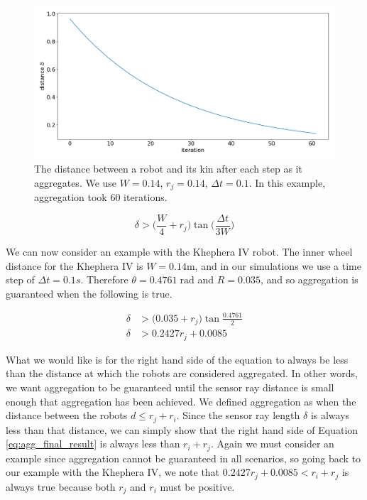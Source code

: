 \documentclass[conference]{IEEEtran}
\begin{document}
    \begin{figure}
      \centering
      \includegraphics[width=1\linewidth]{./images/dist_plot.png}
      \caption{The distance between a robot and its kin after each step as it aggregates. We use $W=0.14$, $r_j=0.14$, $\Delta t=0.1$. In this example, aggregation took 60 iterations.}
      \label{fig:dist_plot}
    \end{figure}

    \begin{equation}
      \label{eq:agg_final_result}
      \delta > \bigg(\frac{W}{4} + r_j\bigg)\tan\bigg(\frac{\Delta t}{3W}\bigg)
    \end{equation}

    We can now consider an example with the Khephera IV robot. The inner wheel distance for the Khephera IV is $W=0.14$m, and in our simulations we use a time step of $\Delta t = 0.1s$. Therefore $\theta = 0.4761\;\text{rad}$ and $R=0.035$, and so aggregation is guaranteed when the following is true.

    \begin{equation} \label{eq:khephera_agg}
      \begin{split}
        \delta &> \bigg(0.035 + r_j\bigg)\tan\frac{0.4761}{2} \\
        \delta &> 0.2427 r_j + 0.0085
      \end{split}
    \end{equation}

     What we would like is for the right hand side of the equation to always be less than the distance at which the robots are considered aggregated. In other words, we want aggregation to be guaranteed until the sensor ray distance is small enough that aggregation has been achieved. We defined aggregation as when the distance between the robots $d \leq r_j+r_i$. Since the sensor ray length $\delta$ is always less than that distance, we can simply show that the right hand side of Equation \ref{eq:agg_final_result} is always less than $r_i+r_j$. Again we must consider an example since aggregation cannot be guaranteed in all scenarios, so going back to our example with the Khephera IV, we note that $0.2427r_j + 0.0085 < r_i+r_j$ is always true because both $r_j$ and $r_i$ must be positive.
\end{document}
